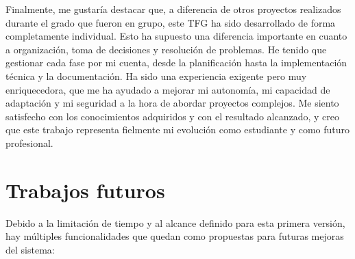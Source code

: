 Finalmente, me gustaría destacar que, a diferencia de otros proyectos realizados durante el grado que fueron en grupo, este TFG ha sido desarrollado de forma completamente individual. Esto ha supuesto una diferencia importante en cuanto a organización, toma de decisiones y resolución de problemas. He tenido que gestionar cada fase por mi cuenta, desde la planificación hasta la implementación técnica y la documentación. Ha sido una experiencia exigente pero muy enriquecedora, que me ha ayudado a mejorar mi autonomía, mi capacidad de adaptación y mi seguridad a la hora de abordar proyectos complejos. Me siento satisfecho con los conocimientos adquiridos y con el resultado alcanzado, y creo que este trabajo representa fielmente mi evolución como estudiante y como futuro profesional.

\section{Trabajos futuros}
Debido a la limitación de tiempo y al alcance definido para esta primera versión, hay múltiples funcionalidades que quedan como propuestas para futuras mejoras del sistema:

